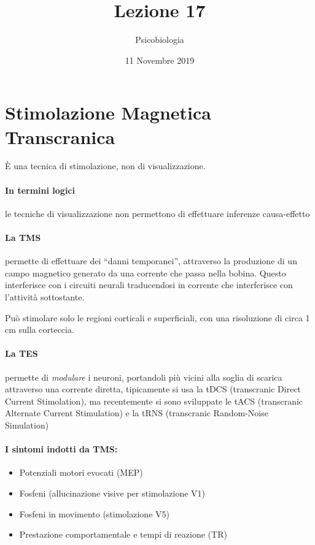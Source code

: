 \documentclass[12pt, a4paper]{article}
\date{11 Novembre 2019}
\title{Lezione 17}
\author{Psicobiologia}
\begin{document}
\maketitle

\section{Stimolazione Magnetica Transcranica}

È una tecnica di stimolazione, non di visualizzazione. 

\paragraph{In termini logici}  le tecniche di visualizzazione non permettono di effettuare inferenze causa-effetto

\paragraph{La TMS}  permette di effettuare dei ``danni temporanei'', attraverso la produzione di un campo magnetico generato da una corrente che passa nella bobina. Questo interferisce con i circuiti neurali traducendosi in corrente che interferisce con l'attività sottostante.

Può stimolare solo le regioni corticali e superficiali, con una risoluzione di circa 1 cm sulla corteccia.

\paragraph{La TES}  permette di \emph{modulare} i neuroni, portandoli più vicini alla soglia di scarica attraverso una corrente diretta, tipicamente si usa la tDCS (transcranic Direct Current Stimolation), ma recentemente si sono sviluppate le tACS (transcranic Alternate Current Stimulation) e la tRNS (transcranic Random-Noise Simulation)

\paragraph{I sintomi indotti da TMS:}
\begin{itemize}
    \item Potenziali motori evocati (MEP)
    \item Fosfeni (allucinazione visive per stimolazione V1)
    \item Fosfeni in movimento (stimolazione V5)
    \item Prestazione comportamentale e tempi di reazione (TR)
\end{itemize}
\end{document}
